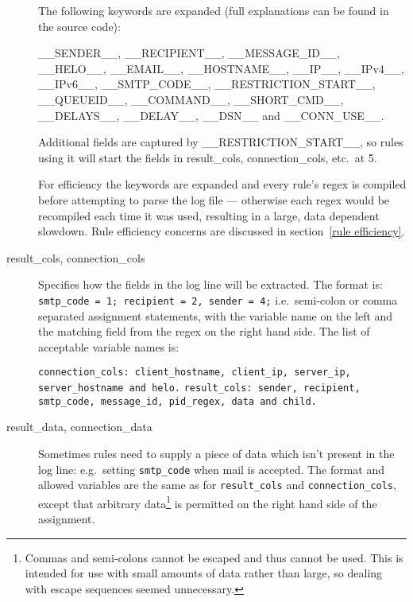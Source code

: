 \documentclass[a4paper,12pt,draft]{article}
\begin{document}
\begin{description}
        The following keywords are expanded (full explanations can be found
        in the source code):

        \_\_SENDER\_\_, \_\_RECIPIENT\_\_, \_\_MESSAGE\_ID\_\_,
        \_\_HELO\_\_, \newline \_\_EMAIL\_\_, \_\_HOSTNAME\_\_, \_\_IP\_\_,
        \_\_IPv4\_\_, \_\_IPv6\_\_, \newline \_\_SMTP\_CODE\_\_,
        \_\_RESTRICTION\_START\_\_, \_\_QUEUEID\_\_, \newline
        \_\_COMMAND\_\_, \_\_SHORT\_CMD\_\_, \_\_DELAYS\_\_, \_\_DELAY\_\_,
        \_\_DSN\_\_ and \_\_CONN\_USE\_\_.

        Additional fields are captured by \_\_RESTRICTION\_START\_\_, so
        rules using it will start the fields in result\_cols,
        connection\_cols, etc.\ at 5.

        For efficiency the keywords are expanded and every rule's regex is
        compiled before attempting to parse the log file --- otherwise each
        regex would be recompiled each time it was used, resulting in a
        large, data dependent slowdown.  Rule efficiency concerns are
        discussed in section~\ref{rule efficiency}.

    \item [result\_cols, connection\_cols] Specifies how the fields in the
        log line will be extracted.  The format is: \newline
        \texttt{smtp\_code = 1; recipient = 2, sender = 4;} \newline
        i.e.\ semi-colon or comma separated assignment statements, with the
        variable name on the left and the matching field from the regex on
        the right hand side.  The list of acceptable variable names is:

        \texttt{connection\_cols: client\_hostname, client\_ip, server\_ip,
        \newline \hspace*{2em} server\_hostname and helo.\newline}
        \texttt{result\_cols: sender, recipient, smtp\_code, message\_id,
        \newline \hspace*{2em} pid\_regex, data and child.}

    \item [result\_data, connection\_data] Sometimes rules need to supply a
        piece of data which isn't present in the log line: e.g.\ setting
        \texttt{smtp\_code} when mail is accepted.  The format and allowed
        variables are the same as for \texttt{result\_cols} and
        \texttt{connection\_cols}, except that arbitrary
        data\footnote{Commas and semi-colons cannot be escaped and thus
        cannot be used.  This is intended for use with small amounts of
        data rather than large, so dealing with escape sequences seemed
        unnecessary.} is permitted on the right hand side of the
        assignment.


\end{description}
\end{document}
